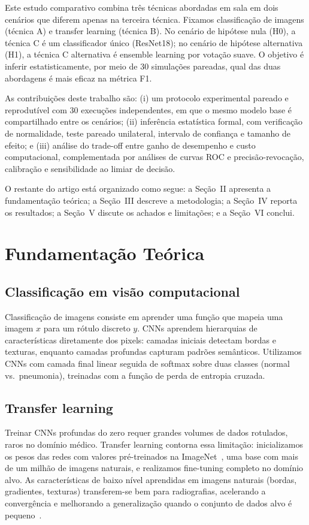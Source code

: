 \documentclass[conference]{IEEEtran}
\begin{document}
Este estudo comparativo combina três técnicas abordadas em sala em dois cenários que diferem apenas na terceira técnica. Fixamos classificação de imagens (técnica A) e transfer learning (técnica B). No cenário de hipótese nula (H0), a técnica C é um classificador único (ResNet18); no cenário de hipótese alternativa (H1), a técnica C alternativa é ensemble learning por votação suave. O objetivo é inferir estatisticamente, por meio de 30 simulações pareadas, qual das duas abordagens é mais eficaz na métrica F1.

As contribuições deste trabalho são: (i) um protocolo experimental pareado e reprodutível com 30 execuções independentes, em que o mesmo modelo base é compartilhado entre os cenários; (ii) inferência estatística formal, com verificação de normalidade, teste pareado unilateral, intervalo de confiança e tamanho de efeito; e (iii) análise do trade-off entre ganho de desempenho e custo computacional, complementada por análises de curvas ROC e precisão-revocação, calibração e sensibilidade ao limiar de decisão.

O restante do artigo está organizado como segue: a Seção~II apresenta a fundamentação teórica; a Seção~III descreve a metodologia; a Seção~IV reporta os resultados; a Seção~V discute os achados e limitações; e a Seção~VI conclui.

\section{Fundamentação Teórica}

\subsection{Classificação em visão computacional}
Classificação de imagens consiste em aprender uma função que mapeia uma imagem $x$ para um rótulo discreto $y$. CNNs aprendem hierarquias de características diretamente dos pixels: camadas iniciais detectam bordas e texturas, enquanto camadas profundas capturam padrões semânticos. Utilizamos CNNs com camada final linear seguida de softmax sobre duas classes (normal vs.\ pneumonia), treinadas com a função de perda de entropia cruzada.

\subsection{Transfer learning}
Treinar CNNs profundas do zero requer grandes volumes de dados rotulados, raros no domínio médico. Transfer learning contorna essa limitação: inicializamos os pesos das redes com valores pré-treinados na ImageNet~\cite{deng2009imagenet}, uma base com mais de um milhão de imagens naturais, e realizamos fine-tuning completo no domínio alvo. As características de baixo nível aprendidas em imagens naturais (bordas, gradientes, texturas) transferem-se bem para radiografias, acelerando a convergência e melhorando a generalização quando o conjunto de dados alvo é pequeno~\cite{pan2010survey}.
\end{document}

